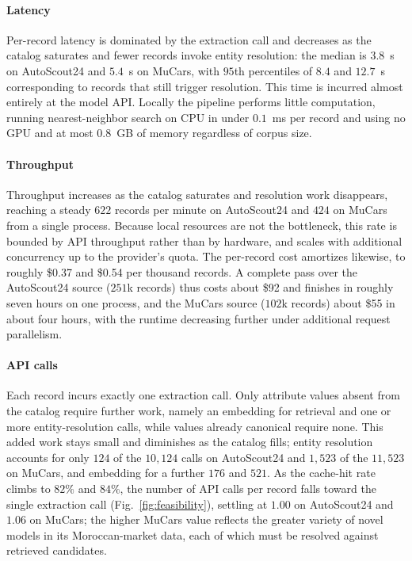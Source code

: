 \documentclass[conference]{IEEEtran}
\begin{document}
\paragraph{Latency}
Per-record latency is dominated by the extraction call and
decreases as the catalog saturates and fewer records invoke entity
resolution: the median is $3.8$~s on AutoScout24 and $5.4$~s on
MuCars, with $95$th percentiles of $8.4$ and $12.7$~s corresponding
to records that still trigger resolution. This time is incurred
almost entirely at the model API. Locally the pipeline performs
little computation, running nearest-neighbor search on CPU in under
$0.1$~ms per record and using no GPU and at most $0.8$~GB of memory
regardless of corpus size.

\paragraph{Throughput}
Throughput increases as the catalog saturates and resolution work
disappears, reaching a steady $622$ records per minute on
AutoScout24 and $424$ on MuCars from a single process. Because
local resources are not the bottleneck, this rate is bounded by API
throughput rather than by hardware, and scales with additional
concurrency up to the provider's quota. The per-record cost
amortizes likewise, to roughly \$0.37 and \$0.54 per thousand
records. A complete pass over the AutoScout24 source ($251$k
records) thus costs about \$92 and finishes in roughly seven hours on
one process, and the MuCars source ($102$k records) about
\$55 in about four hours, with the runtime decreasing further under
additional request parallelism.

\paragraph{API calls}
Each record incurs exactly one extraction call. Only attribute
values absent from the catalog require further work, namely an
embedding for retrieval and one or more entity-resolution calls,
while values already canonical require none. This added work stays
small and diminishes as the catalog fills; entity resolution
accounts for only $124$ of the $10{,}124$ calls on AutoScout24 and
$1{,}523$ of the $11{,}523$ on MuCars, and embedding for a further
$176$ and $521$. As the cache-hit rate climbs to $82\%$ and $84\%$,
the number of API calls per record falls toward the single
extraction call (Fig.~\ref{fig:feasibility}), settling at $1.00$ on
AutoScout24 and $1.06$ on MuCars; the higher MuCars value reflects
the greater variety of novel models in its Moroccan-market data,
each of which must be resolved against retrieved candidates.
\end{document}
